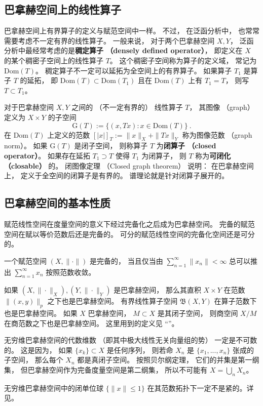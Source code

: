 \subsection{巴拿赫空间上的线性算子}

巴拿赫空间上有界算子的定义与赋范空间中一样。 不过， 在泛函分析中， 也常常需要考虑不一定有界的线性算子。 一般来说， 对于两个巴拿赫空间 $X,Y$， 泛函分析中最经常考虑的是\textbf{稠定算子 （densely defined operator）}， 即定义在 $X$ 的某个稠密子空间上的线性算子 $T$。 这个稠密子空间称为算子的定义域， 常记为 $\text{Dom}(T)$。 稠定算子不一定可以延拓为全空间上的有界算子。 如果算子 $T_1$ 是算子 $T$ 的延拓， 即 $\text{Dom}(T)\subset \text{Dom}(T_1)$ 且在 $\text{Dom}(T)$ 上有 $T_1=T$， 则写 $T\subset T_1$。

对于巴拿赫空间 $X,Y$ 之间的 （不一定有界的） 线性算子 $T$， 其图像 （graph） 定义为 $X\times Y$ 的子空间
$$
\text{G}(T):=\{(x,Tx):x\in \text{Dom}(T)\}~.
$$
在 $\text{Dom}(T)$ 上定义的范数 $[|x|]_T:=\|x\|_X+\|Tx\|_Y$ 称为图像范数 （graph norm）。 如果 $\text{G}(T)$ 是闭子空间， 则称算子 $T$ 为\textbf{闭算子 （closed operator）}。 如果存在延拓 $T_1\supset T$ 使得 $T_1$ 为闭算子， 则 $T$ 称为\textbf{可闭化 （closable）} 的。 闭图像定理 （Closed graph theorem） 说明： 在巴拿赫空间上， 定义于全空间的闭算子是有界的。 谱理论就是针对闭算子展开的。

\subsection{巴拿赫空间的基本性质}
赋范线性空间在度量空间的意义下经过完备化之后成为巴拿赫空间。 完备的赋范空间在赋以等价范数后还是完备的。 可分的赋范线性空间的完备化空间还是可分的。 

一个赋范空间 $(X,\|\cdot\|)$ 是完备的， 当且仅当由 $\sum _{n=1}^{\infty }\|x_{n}\|<\infty $ 总可以推出 $\sum _{n=1}^{\infty }x_{n}$ 按照范数收敛。

如果 $(X,\|\cdot\|_X),(Y,\|\cdot\|_Y)$ 是巴拿赫空间， 那么其直积 $X\times Y$ 在范数 $\|(x,y)\|_{p}$ 之下也是巴拿赫空间。 有界线性算子空间 $\mathfrak{B}(X,Y)$ 在算子范数下也是巴拿赫空间。 如果 $X$ 巴拿赫空间， $M\subset X$ 是其闭子空间， 则商空间 $X/M$ 在商范数之下也是巴拿赫空间。 这里用到的定义见 “”。

无穷维巴拿赫空间的代数维数 （即其中极大线性无关向量组的势） 一定是不可数的。 这是因为， 如果 $\{x_k\}\subset X$ 是任何序列， 则若命 $X_n$ 是 $\{x_1,...,x_n\}$ 张成的子空间， 那么每个 $X_n$ 都是真闭子空间。 按照贝尔纲定理， 它们的并集是第一纲集， 但巴拿赫空间作为完备度量空间是第二纲集， 所以不可能有 $X=\bigcup_n X_n$。

无穷维巴拿赫空间中的闭单位球 $\{\|x\|\leq1\}$ 在其范数拓扑下一定不是紧的。详见。
